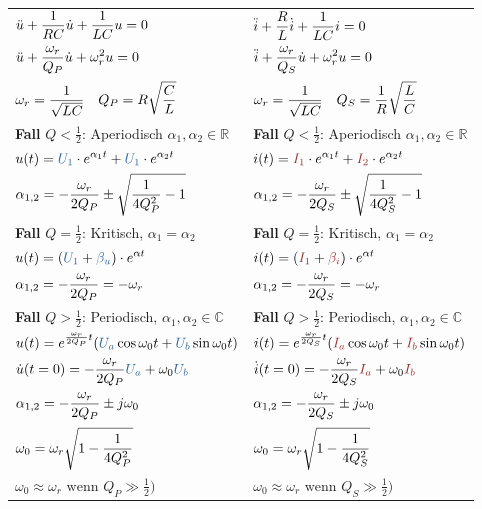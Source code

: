 \documentclass{article}
\begin{document}
\begin{twocolumn}
\begin{tabularx}{\columnwidth}{Y|Y}
  $\displaystyle \ddot{u} + \frac{1}{RC} \dot{u} + \frac{1}{LC}u = 0$ &
  $\displaystyle \ddot{i} + \frac{R}{L} \dot{i} + \frac{1}{LC}i = 0$ \\
  $\displaystyle \ddot{u} + \frac{\omega_r}{Q_P} \dot{u} + \omega_r^2 u = 0$ &
  $\displaystyle \ddot{i} + \frac{\omega_r}{Q_S} \dot{u} + \omega_r^2 u = 0$ \\
  $\displaystyle \omega_r = \frac{1}{\sqrt{LC}} \quad Q_P = R \sqrt{\frac{C}{L}}$ &
  $\displaystyle \omega_r = \frac{1}{\sqrt{LC}} \quad Q_S = \frac{1}{R} \sqrt{\frac{L}{C}}$  \\
  \textbf{Fall} $Q < \frac{1}{2}$: Aperiodisch $\alpha_1, \alpha_2 \in \mathbb{R}$  &
  \textbf{Fall} $Q < \frac{1}{2}$: Aperiodisch $\alpha_1, \alpha_2 \in \mathbb{R}$ \\
  $\fmm u(t) = \textcolor{cBlue}{U_1} \cdot e^{\alpha_1 t} + \textcolor{cBlue}{U_1} \cdot
  e^{\alpha_2 t}$ & 
  $\fmm i(t) = \textcolor{cRed}{I_1} \cdot e^{\alpha_1 t} + \textcolor{cRed}{I_2} \cdot
  e^{\alpha_2 t}$ \\
  $\displaystyle \alpha_{1,2} = -\frac{\omega_r}{2Q_P} \pm \sqrt{\frac{1}{4Q_P^2}-1}$ &
  $\displaystyle \alpha_{1,2} = -\frac{\omega_r}{2Q_S} \pm \sqrt{\frac{1}{4Q_S^2}-1}$ \\
  \textbf{Fall} $Q = \frac{1}{2}$: Kritisch, $\alpha_1 = \alpha_2$ &
  \textbf{Fall} $Q = \frac{1}{2}$: Kritisch, $\alpha_1 = \alpha_2$ \\
  $\fmm u(t) = (\textcolor{cBlue}{U_1} + \textcolor{cBlue}{\beta_u}) \cdot e^{\alpha t}$ &
  $\fmm i(t) = (\textcolor{cRed}{I_1} + \textcolor{cRed}{\beta_i}) \cdot e^{\alpha t}$ \\
  $\displaystyle \alpha_{1,2} = -\frac{\omega_r}{2Q_P} = -\omega_r$ &
  $\displaystyle \alpha_{1,2} = -\frac{\omega_r}{2Q_S} = -\omega_r$ \\
  \textbf{Fall} $Q > \frac{1}{2}$: Periodisch, $\alpha_1, \alpha_2 \in \mathbb{C}$ &  
  \textbf{Fall} $Q > \frac{1}{2}$: Periodisch, $\alpha_1, \alpha_2 \in \mathbb{C}$ \\
  $\fmm u(t) = e^{\frac{\omega_r}{2 Q_P} t} (\textcolor{cBlue}{U_a} \cos{\omega_0
  t} + \textcolor{cBlue}{U_b} \sin{\omega_0 t})$ &
  $\fmm i(t) = e^{\frac{\omega_r}{2 Q_S} t} (\textcolor{cRed}{I_a} \cos{\omega_0
  t} + \textcolor{cRed}{I_b} \sin{\omega_0 t})$ \\
  $\fmm \dot{u}(t = 0) = - \frac{\omega_r}{2Q_P} \textcolor{cBlue}{U_a} + \omega_0
  \textcolor{cBlue}{U_b}$ &
  $\fmm \dot{i}(t = 0) = - \frac{\omega_r}{2Q_S} \textcolor{cRed}{I_a} + \omega_0
  \textcolor{cRed}{I_b}$ \\
  $\displaystyle \alpha_{1,2} = -\frac{\omega_r}{2 Q_P} \pm j \omega_0$ &
  $\displaystyle \alpha_{1,2} = -\frac{\omega_r}{2 Q_S} \pm j \omega_0$ \\
  $\displaystyle \omega_0 = \omega_r \sqrt{1-\frac{1}{4 Q_P^2}}$ &
  $\displaystyle \omega_0 = \omega_r \sqrt{1-\frac{1}{4 Q_S^2}}$ \\
  $\omega_0 \approx \omega_r \text{ wenn } Q_P \gg \frac{1}{2})$ &
  $\omega_0 \approx \omega_r \text{ wenn } Q_S \gg \frac{1}{2})$
\end{tabularx}


\end{twocolumn}
\end{document}
